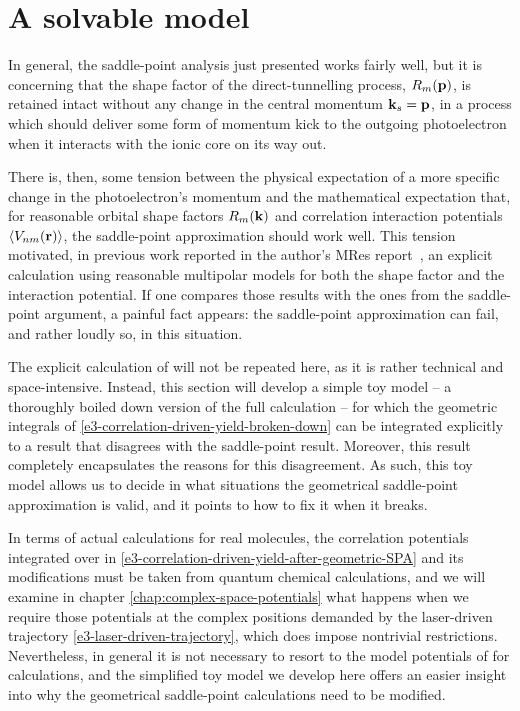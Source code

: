 \section{A solvable model}
In general, the saddle-point analysis just presented works fairly well, but it is concerning that the shape factor of the direct-tunnelling process, $R_m(\vb{p})$, is retained intact without any change in the central momentum $\vb{k}_s=\vb{p}$, in a process which should deliver some form of momentum kick to the outgoing photoelectron when it interacts with the ionic core on its way out. 

There is, then, some tension between the physical expectation of a more specific change in the photoelectron's momentum and the mathematical expectation that, for reasonable orbital shape factors $R_m(\vb{k})$ and correlation interaction potentials $\left\langle V_{nm}\mathopen{}\left( \vb{r} \right)\mathclose{} \right\rangle$, the saddle-point approximation should work well. This tension motivated, in previous work reported in the author's MRes report~\cite{MResReport}, an explicit calculation using reasonable multipolar models for both the shape factor and the interaction potential. If one compares those results with the ones from the saddle-point argument, a painful fact appears: the saddle-point approximation can fail, and rather loudly so, in this situation.

The explicit calculation of  will not be repeated here, as it is rather technical and space-intensive. Instead, this section will develop a simple toy model -- a thoroughly boiled down version of the full calculation -- for which the geometric integrals of \eqref{e3-correlation-driven-yield-broken-down} can be integrated explicitly to a result that disagrees with the saddle-point result. Moreover, this result completely encapsulates the reasons for this disagreement. As such, this toy model allows us to decide in what situations the geometrical saddle-point approximation is valid, and it points to how to fix it when it breaks. 

In terms of actual calculations for real molecules, the correlation potentials integrated over in \eqref{e3-correlation-driven-yield-after-geometric-SPA} and its modifications must be taken from quantum chemical calculations, and we will examine in chapter \ref{chap:complex-space-potentials} what happens when we require those potentials at the complex positions demanded by the laser-driven trajectory \eqref{e3-laser-driven-trajectory}, which does impose nontrivial restrictions. Nevertheless, in general it is not necessary to resort to the model potentials of  for calculations, and the simplified toy model we develop here offers an easier insight into why the geometrical saddle-point calculations need to be modified.

